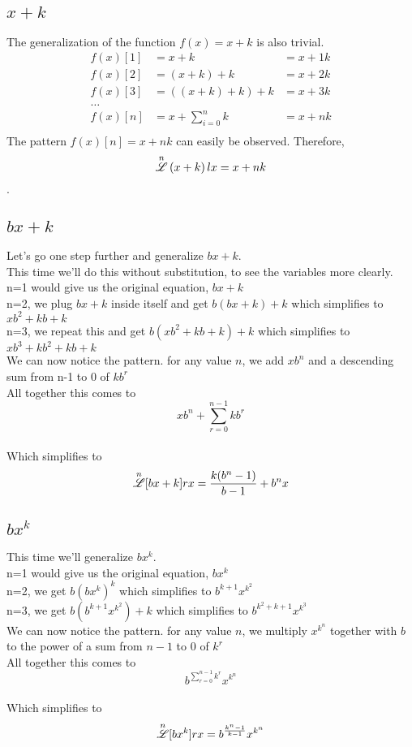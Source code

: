 \documentclass[12pt, letterpaper]{article}
\begin{document}
\subsection{$x+k$}
The generalization of the function $f(x) = x+k$ is also trivial.
\begin{align*}
    f(x)[1] &= x + k             &= x + 1k \\
    f(x)[2] &= (x + k) + k       &= x + 2k \\
    f(x)[3] &= ((x + k) + k) + k &= x + 3k \\
       \dots \\
    f(x)[n] &= x + \sum_{i=0}^n k  &= x + nk \\
\end{align*}
The pattern $f(x)[n] = x + nk$ can easily be observed. Therefore,
$$\overset{n}{\mathscr{L}} \, (x+k) \, lx = x+nk$$.
\\

\subsection{$bx+k$}
Let's go one step further and generalize {$bx+k$}.
\\This time we'll do this without substitution, to see the variables more clearly.
\\n=1 would give us the original equation, {$bx+k$}
\\n=2, we plug {$bx+k$} inside itself and get {$b(bx+k)+k$} which simplifies to {$xb^{2}+kb+k$}
\\n=3, we repeat this and get {$b(xb^{2}+kb+k)+k$} which simplifies to {$xb^{3} + kb^{2} + kb + k$}
\\We can now notice the pattern. for any value {$n$}, we add {$xb^{n}$} and a descending sum from n-1 to 0 of {$kb^{r}$}
\\All together this comes to $$xb^{n}+\sum_{r=0}^{n-1} kb^{r}$$
\\Which simplifies to
$$\overset{n}{\mathscr{L}} [bx+k] rx = \frac{k(b^{n}-1)}{b-1}+b^{n}x$$

\subsection{$bx^k$}
This time we'll generalize {$bx^k$}.
\\n=1 would give us the original equation, {$bx^{k}$}
\\n=2, we get {$b(bx^{k})^{k}$} which simplifies to {$b^{k+1}x^{k^{2}}$}
\\n=3, we get {$b(b^{k+1}x^{k^{2}})+k$} which simplifies to {$b^{k^{2} + k + 1} x^{k^{3}}$}
\\We can now notice the pattern. for any value {$n$}, we multiply {$x^{k^{n}}$} together with {$b$} to the power of a sum from {$n-1$} to {$0$} of {$k^{r}$}
\\All together this comes to $$b^{\sum_{r=0}^{n-1} k^{r}} x^{k^{n}}$$
\\Which simplifies to
$$\overset{n}{\mathscr{L}} [bx^k] rx = b^{\frac{k^{n}-1}{k-1}}x^{k^{n}}$$
\end{document}
